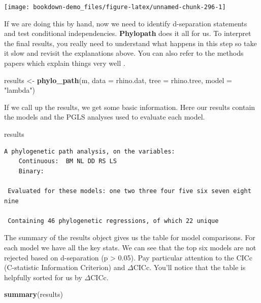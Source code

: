 \documentclass[
]{book}
\newenvironment{Shaded}{\begin{snugshade}}{\end{snugshade}}
\newcommand{\DataTypeTok}[1]{\textcolor[rgb]{0.13,0.29,0.53}{#1}}
\newcommand{\KeywordTok}[1]{\textcolor[rgb]{0.13,0.29,0.53}{\textbf{#1}}}
\newcommand{\NormalTok}[1]{#1}
\newcommand{\StringTok}[1]{\textcolor[rgb]{0.31,0.60,0.02}{#1}}
\begin{document}
\begin{center}\texttt{[image: bookdown-demo\_files/figure-latex/unnamed-chunk-296-1]} \end{center}

If we are doing this by hand, now we need to identify d-separation statements and test conditional independencies. \textbf{Phylopath} does it all for us. To interpret the final results, you really need to understand what happens in this step so take it slow and revisit the explanations above. You can also refer to the methods papers which explain things very well \citep{Hardenberg13, Gonzalez14}.

\begin{Shaded}
\begin{Highlighting}[]
\NormalTok{results \textless{}{-}}\StringTok{ }\KeywordTok{phylo\_path}\NormalTok{(m, }\DataTypeTok{data =}\NormalTok{ rhino.dat, }\DataTypeTok{tree =}\NormalTok{ rhino.tree, }\DataTypeTok{model =} \StringTok{"lambda"}\NormalTok{)}
\end{Highlighting}
\end{Shaded}

If we call up the results, we get some basic information. Here our results contain the models and the PGLS analyses used to evaluate each model.

\begin{Shaded}
\begin{Highlighting}[]
\NormalTok{results}
\end{Highlighting}
\end{Shaded}

\begin{verbatim}
A phylogenetic path analysis, on the variables:
    Continuous:  BM NL DD RS LS 
    Binary:       

 Evaluated for these models: one two three four five six seven eight nine 

 Containing 46 phylogenetic regressions, of which 22 unique
\end{verbatim}

The summary of the results object gives us the table for model comparisons. For each model we have all the key stats. We can see that the top six models are not rejected based on d-separation (p \textgreater{} 0.05). Pay particular attention to the CICc (C-statistic Information Criterion) and \(\Delta\)CICc. You'll notice that the table is helpfully sorted for us by \(\Delta\)CICc.

\begin{Shaded}
\begin{Highlighting}[]
\KeywordTok{summary}\NormalTok{(results)}
\end{Highlighting}
\end{Shaded}
\end{document}
